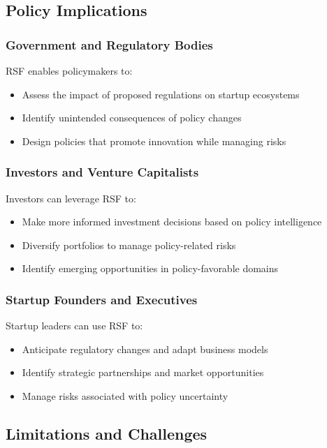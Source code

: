 \documentclass[conference]{IEEEtran}
\begin{document}
\subsection{Policy Implications}

\subsubsection{Government and Regulatory Bodies}
RSF enables policymakers to:
\begin{itemize}
    \item Assess the impact of proposed regulations on startup ecosystems
    \item Identify unintended consequences of policy changes
    \item Design policies that promote innovation while managing risks
\end{itemize}

\subsubsection{Investors and Venture Capitalists}
Investors can leverage RSF to:
\begin{itemize}
    \item Make more informed investment decisions based on policy intelligence
    \item Diversify portfolios to manage policy-related risks
    \item Identify emerging opportunities in policy-favorable domains
\end{itemize}

\subsubsection{Startup Founders and Executives}
Startup leaders can use RSF to:
\begin{itemize}
    \item Anticipate regulatory changes and adapt business models
    \item Identify strategic partnerships and market opportunities
    \item Manage risks associated with policy uncertainty
\end{itemize}

\subsection{Limitations and Challenges}
\end{document}
